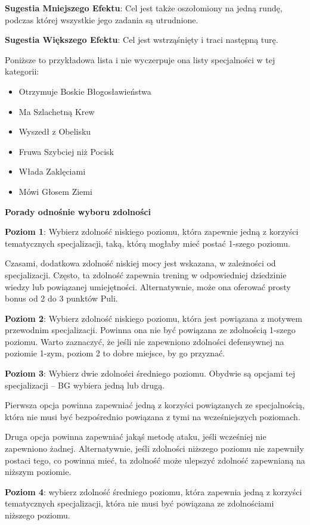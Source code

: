 \textbf{Sugestia Mniejszego Efektu}: Cel jest także oszołomiony na jedną rundę, podczas której wszystkie jego zadania są utrudnione.

\textbf{Sugestia Większego Efektu}: Cel jest wstrząśnięty i traci następną turę. 

Poniższe to przykładowa lista i nie wyczerpuje ona listy specjalności w tej kategorii:

\begin{itemize}
\item Otrzymuje Boskie Błogosławieństwa
\item Ma Szlachetną Krew
\item Wyszedł z Obelisku
\item Fruwa Szybciej niż Pocisk
\item Włada Zaklęciami
\item Mówi Głosem Ziemi
\end{itemize}

\textbf{Porady odnośnie wyboru zdolności}

\textbf{Poziom 1}: Wybierz zdolność niskiego poziomu, która zapewnie jedną z korzyści tematycznych specjalizacji, taką, którą mogłaby mieć postać 1-szego poziomu.

Czasami, dodatkowa zdolność niskiej mocy jest wskazana, w zależności od specjalizacji. Często, ta zdolność zapewnia trening w odpowiedniej dziedzinie wiedzy lub powiązanej umiejętności. Alternatywnie, może ona oferować prosty bonus od 2 do 3 punktów Puli.

\textbf{Poziom 2}: Wybierz zdolność niskiego poziomu, która jest powiązana z motywem przewodnim specjalizacji. Powinna ona nie być powiązana ze zdolnością 1-szego poziomu. Warto zaznaczyć, że jeśli nie zapewniono zdolności defensywnej na poziomie 1-zym, poziom 2 to dobre miejsce, by go przyznać.

\textbf{Poziom 3}: Wybierz dwie zdolności średniego poziomu. Obydwie są opcjami tej specjalizacji – BG wybiera jedną lub drugą.

Pierwsza opcja powinna zapewniać jedną z korzyści powiązanych ze specjalnością, która nie musi być bezpośrednio powiązana z tymi na wcześniejszych poziomach.

Druga opcja powinna zapewniać jakąś metodę ataku, jeśli wcześniej nie zapewniono żadnej. Alternatywnie, jeśli zdolności niższego poziomu nie zapewniły postaci tego, co powinna mieć, ta zdolność może ulepszyć zdolność zapewnianą na niższym poziomie.

\textbf{Poziom 4}: wybierz zdolność średniego poziomu, która zapewnia jedną z korzyści tematycznych specjalizacji, która nie musi być powiązana ze zdolnościami niższego poziomu.

